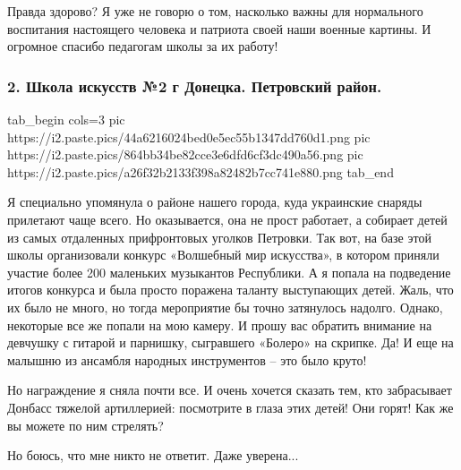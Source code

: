 
Правда здорово? Я уже не говорю о том, насколько важны для нормального
воспитания настоящего человека и патриота своей наши военные картины. И
огромное спасибо педагогам школы за их работу!

\subsubsection{2. Школа искусств №2 г Донецка. Петровский район.}

\ifcmt
  tab_begin cols=3
     pic https://i2.paste.pics/44a6216024bed0e5ec55b1347dd760d1.png
		 pic https://i2.paste.pics/864bb34be82cce3e6dfd6cf3dc490a56.png
		 pic https://i2.paste.pics/a26f32b2133f398a82482b7cc741e880.png
  tab_end
\fi

Я специально упомянула о районе нашего города, куда украинские снаряды
прилетают чаще всего. Но оказывается, она не прост работает, а собирает детей
из самых отдаленных прифронтовых уголков Петровки. Так вот, на базе этой школы
организовали конкурс «Волшебный мир искусства», в котором приняли участие более
200 маленьких музыкантов Республики. А я попала на подведение итогов конкурса и
была просто поражена таланту выступающих детей. Жаль, что их было не много, но
тогда мероприятие бы точно затянулось надолго. Однако, некоторые все же попали
на мою камеру. И прошу вас обратить внимание на девчушку с гитарой и парнишку,
сыгравшего «Болеро» на скрипке. Да! И еще на малышню из ансамбля народных
инструментов – это было круто!


Но награждение я сняла почти все. И очень хочется сказать тем, кто забрасывает
Донбасс тяжелой артиллерией: посмотрите в глаза этих детей! Они горят! Как же
вы можете по ним стрелять?

Но боюсь, что мне никто не ответит. Даже уверена...

